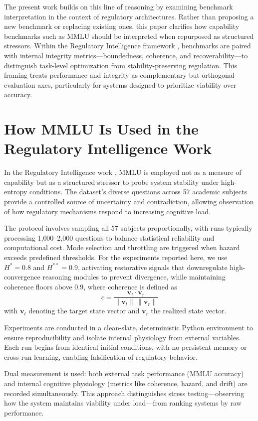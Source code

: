 \documentclass[12pt,a4paper]{article}
\begin{document}
The present work builds on this line of reasoning by examining benchmark interpretation in the context of regulatory architectures. Rather than proposing a new benchmark or replacing existing ones, this paper clarifies how capability benchmarks such as MMLU should be interpreted when repurposed as structured stressors. Within the Regulatory Intelligence framework \cite{Cragin2026RI}, benchmarks are paired with internal integrity metrics—boundedness, coherence, and recoverability—to distinguish task-level optimization from stability-preserving regulation. This framing treats performance and integrity as complementary but orthogonal evaluation axes, particularly for systems designed to prioritize viability over accuracy.

\section{How MMLU Is Used in the Regulatory Intelligence Work}

In the Regulatory Intelligence work \cite{Cragin2026RI}, MMLU is employed not as a measure of capability but as a structured stressor to probe system stability under high-entropy conditions. The dataset's diverse questions across 57 academic subjects provide a controlled source of uncertainty and contradiction, allowing observation of how regulatory mechanisms respond to increasing cognitive load.

The protocol involves sampling all 57 subjects proportionally, with runs typically processing 1{,}000--2{,}000 questions to balance statistical reliability and computational cost. Mode selection and throttling are triggered when hazard exceeds predefined thresholds. For the experiments reported here, we use $H^{*} = 0.8$ and $H^{**} = 0.9$, activating restorative signals that downregulate high-convergence reasoning modules to prevent divergence, while maintaining coherence floors above $0.9$, where coherence is defined as
\[
c = \frac{\mathbf{v}_t \cdot \mathbf{v}_r}{\lVert \mathbf{v}_t \rVert \, \lVert \mathbf{v}_r \rVert}
\]
with $\mathbf{v}_t$ denoting the target state vector and $\mathbf{v}_r$ the realized state vector.

Experiments are conducted in a clean-slate, deterministic Python environment to ensure reproducibility and isolate internal physiology from external variables. Each run begins from identical initial conditions, with no persistent memory or cross-run learning, enabling falsification of regulatory behavior.

Dual measurement is used: both external task performance (MMLU accuracy) and internal cognitive physiology (metrics like coherence, hazard, and drift) are recorded simultaneously. This approach distinguishes stress testing—observing how the system maintains viability under load—from ranking systems by raw performance.
\end{document}
